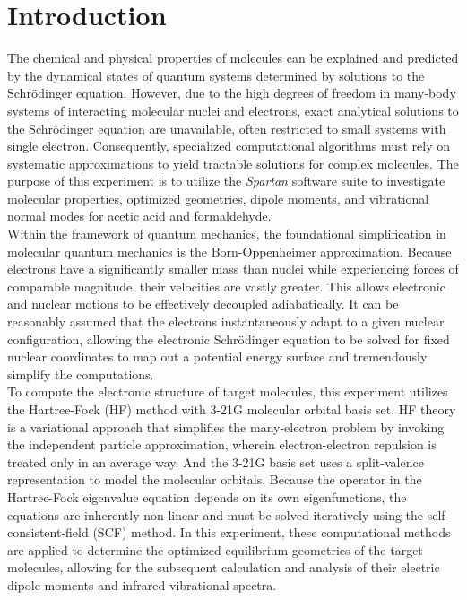 \documentclass[12pt]{article}
\begin{document}
\section*{Introduction}
The chemical and physical properties of molecules can be explained and predicted by the dynamical states of quantum systems determined by solutions to the Schrödinger equation. \cite{lab_manual} However, due to the high degrees of freedom in many-body systems of interacting molecular nuclei and electrons, exact analytical solutions to the Schrödinger equation are unavailable, often restricted to small systems with single electron. Consequently, specialized computational algorithms must rely on systematic approximations to yield tractable solutions for complex molecules. The purpose of this experiment is to utilize the \textit{Spartan} \cite{spartan}  software suite to investigate molecular properties, optimized geometries, dipole moments, and vibrational normal modes for acetic acid and formaldehyde. 
\\
Within the framework of quantum mechanics, the foundational simplification in molecular quantum mechanics is the Born-Oppenheimer approximation. \cite{born1927quantentheorie} Because electrons have a significantly smaller mass than nuclei while experiencing forces of comparable magnitude, their velocities are vastly greater. This allows electronic and nuclear motions to be effectively decoupled adiabatically. It can be reasonably assumed that the electrons instantaneously adapt to a given nuclear configuration, allowing the electronic Schrödinger equation to be solved for fixed nuclear coordinates to map out a potential energy surface and tremendously simplify the computations. 
\\
To compute the electronic structure of target molecules, this experiment utilizes the Hartree-Fock \cite{hf1, hf2, hf3} (HF) method with 3-21G \cite{321G} molecular orbital basis set. HF theory is a variational approach that simplifies the many-electron problem by invoking the independent particle approximation, wherein electron-electron repulsion is treated only in an average way. And the 3-21G basis set uses a split-valence representation to model the molecular orbitals. Because the operator in the Hartree-Fock eigenvalue equation depends on its own eigenfunctions, the equations are inherently non-linear and must be solved iteratively using the self-consistent-field (SCF) method. In this experiment, these computational methods are applied to determine the optimized equilibrium geometries of the target molecules, allowing for the subsequent calculation and analysis of their electric dipole moments and infrared vibrational spectra. 
\end{document}
